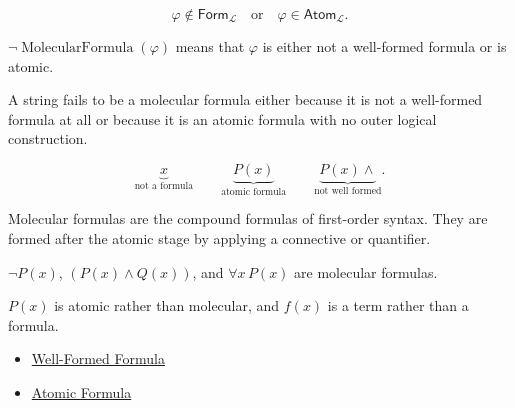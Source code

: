\begin{remark*}
\[
\varphi\notin\mathsf{Form}_{\mathcal L}
\quad\text{or}\quad
\varphi\in\mathsf{Atom}_{\mathcal L}.
\]
\end{remark*}

\begin{remark*}
\(\neg\operatorname{MolecularFormula}(\varphi)\) means that \(\varphi\) is
either not a well-formed formula or is atomic.
\end{remark*}

\begin{remark*}
A string fails to be a molecular formula either because it is not a
well-formed formula at all or because it is an atomic formula with no outer
logical construction.
\end{remark*}

\begin{remark*}
\[
\underbrace{x}_{\text{not a formula}}
\qquad
\underbrace{P(x)}_{\text{atomic formula}}
\qquad
\underbrace{P(x)\land}_{\text{not well formed}}.
\]
\end{remark*}

\begin{remark*}[Interpretation]
Molecular formulas are the compound formulas of first-order syntax. They are
formed after the atomic stage by applying a connective or quantifier.
\end{remark*}

\begin{remark*}[Examples]
\(\neg P(x)\), \((P(x)\land Q(x))\), and \(\forall x\,P(x)\) are molecular
formulas.
\end{remark*}

\begin{remark*}
\(P(x)\) is atomic rather than molecular, and \(f(x)\) is a term rather than a
formula.
\end{remark*}

\begin{dependencies}
\begin{itemize}
  \item \hyperref[def:wff-pred]{Well-Formed Formula}
  \item \hyperref[def:atomic-formula]{Atomic Formula}
\end{itemize}
\end{dependencies}
